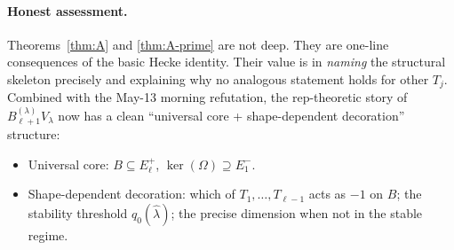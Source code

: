 \documentclass[11pt]{article}
\theoremstyle{definition}
\newcommand{\Bdec}{B_{\ell+1}^{(\lambda)}}
\newcommand{\Om}{\Omega}
\begin{document}
\paragraph*{Honest assessment.}
Theorems~\ref{thm:A} and \ref{thm:A-prime} are not deep. They are
one-line consequences of the basic Hecke identity. Their value is in
\emph{naming} the structural skeleton precisely and explaining why no
analogous statement holds for other $T_j$. Combined with the May-13
morning refutation, the rep-theoretic story of $\Bdec V_\lambda$ now has
a clean ``universal core + shape-dependent decoration'' structure:
\begin{itemize}[topsep=0.2em,itemsep=0.1em]
\item Universal core: $B \subseteq E_\ell^+$, $\ker(\Om) \supseteq E_1^-$.
\item Shape-dependent decoration: which of $T_1, \ldots, T_{\ell-1}$
acts as $-1$ on $B$; the stability threshold $q_0(\widehat\lambda)$;
the precise dimension when not in the stable regime.
\end{itemize}
\end{document}
